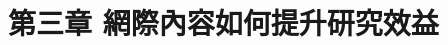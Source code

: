 \chapter{第三章 \quad 網際內容如何提升研究效益}
\renewcommand{\baselinestretch}{10} %
\par
\renewcommand{\baselinestretch}{1} %
\twelve \qquad 
\par